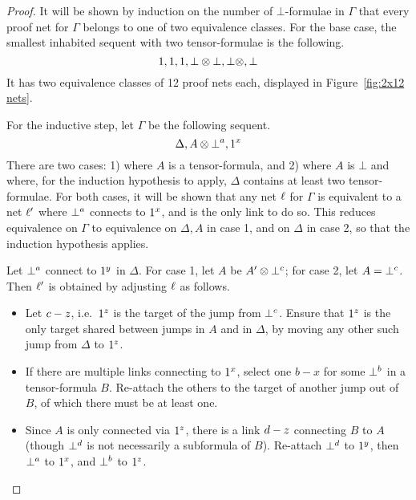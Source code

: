 \begin{proof}
%
It will be shown by induction on the number of $\bot$-formulae in $\Gamma$ that every proof net for $\Gamma$ belongs to one of two equivalence classes.
%
For the base case, the smallest inhabited sequent with two tensor-formulae is the following.
\[
	\1,\1,\1,\bot\tn\bot,\bot\tn,\bot
\]
It has two equivalence classes of 12 proof nets each, displayed in Figure~\ref{fig:2x12 nets}.



For the inductive step, let $\Gamma$ be the following sequent.
\[
	\Delta,A\tn\named a\bot,\named x\1
\]
There are two cases: 1) where $A$ is a tensor-formula, and 2) where $A$ is $\bot$ and where, for the induction hypothesis to apply, $\Delta$ contains at least two tensor-formulae.
%
For both cases, it will be shown that any net $\links$ for $\Gamma$ is equivalent to a net $\links'$ where $\named a\bot$ connects to $\named x1$, and is the only link to do so.
%
This reduces equivalence on $\Gamma$ to equivalence on $\Delta,A$ in case 1, and on $\Delta$ in case 2, so that the induction hypothesis applies.


Let $\named a\bot$ connect to $\named y\1$ in $\Delta$.
%
For case 1, let $A$ be $A'\tn\named c\bot$; for case 2, let $A=\named c\bot$.
%
Then $\links'$ is obtained by adjusting $\links$ as follows.
\begin{itemize}

	\item
Let $\edge cz$, i.e.\ $\named z\1$ is the target of the jump from $\named c\bot$.	
%
Ensure that $\named z\1$ is the only target shared between jumps in $A$ and in $\Delta$, by moving any other such jump from $\Delta$ to $\named z\1$.

	\item
If there are multiple links connecting to $\named x\1$, select one $b-x$ for some $\named b\bot$ in a tensor-formula $B$.
%
Re-attach the others to the target of another jump out of $B$, of which there must be at least one.

	\item
Since $A$ is only connected via $\named z\1$, there is a link $\edge dz$ connecting $B$ to $A$ (though $\named d\bot$ is not necessarily a subformula of $B$).
%
Re-attach $\named d\bot$ to $\named y\1$, then $\named a\bot$ to $\named x\1$, and $\named b\bot$ to $\named z\1$.

\end{itemize}

\end{proof}




